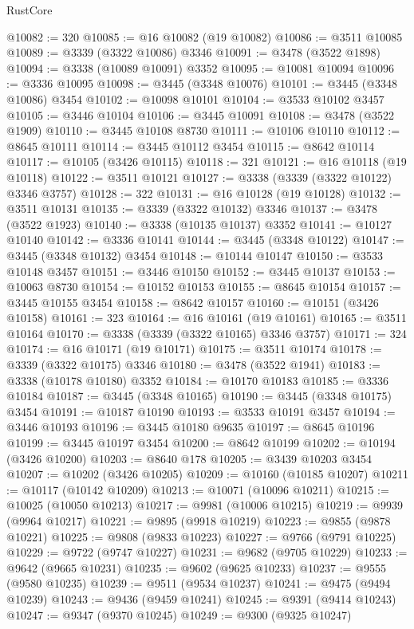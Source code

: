 \begin{lexlean}{RustCore}
\begin{coremodule}
@10082 := 320
@10085 := @16 @10082 (@19 @10082)
@10086 := @3511 @10085
@10089 := @3339 (@3322 @10086) @3346
@10091 := @3478 (@3522 @1898)
@10094 := @3338 (@10089 @10091) @3352
@10095 := @10081 @10094
@10096 := @3336 @10095
@10098 := @3445 (@3348 @10076)
@10101 := @3445 (@3348 @10086) @3454
@10102 := @10098 @10101
@10104 := @3533 @10102 @3457
@10105 := @3446 @10104
@10106 := @3445 @10091
@10108 := @3478 (@3522 @1909)
@10110 := @3445 @10108 @8730
@10111 := @10106 @10110
@10112 := @8645 @10111
@10114 := @3445 @10112 @3454
@10115 := @8642 @10114
@10117 := @10105 (@3426 @10115)
@10118 := 321
@10121 := @16 @10118 (@19 @10118)
@10122 := @3511 @10121
@10127 := @3338 (@3339 (@3322 @10122) @3346 @3757)
@10128 := 322
@10131 := @16 @10128 (@19 @10128)
@10132 := @3511 @10131
@10135 := @3339 (@3322 @10132) @3346
@10137 := @3478 (@3522 @1923)
@10140 := @3338 (@10135 @10137) @3352
@10141 := @10127 @10140
@10142 := @3336 @10141
@10144 := @3445 (@3348 @10122)
@10147 := @3445 (@3348 @10132) @3454
@10148 := @10144 @10147
@10150 := @3533 @10148 @3457
@10151 := @3446 @10150
@10152 := @3445 @10137
@10153 := @10063 @8730
@10154 := @10152 @10153
@10155 := @8645 @10154
@10157 := @3445 @10155 @3454
@10158 := @8642 @10157
@10160 := @10151 (@3426 @10158)
@10161 := 323
@10164 := @16 @10161 (@19 @10161)
@10165 := @3511 @10164
@10170 := @3338 (@3339 (@3322 @10165) @3346 @3757)
@10171 := 324
@10174 := @16 @10171 (@19 @10171)
@10175 := @3511 @10174
@10178 := @3339 (@3322 @10175) @3346
@10180 := @3478 (@3522 @1941)
@10183 := @3338 (@10178 @10180) @3352
@10184 := @10170 @10183
@10185 := @3336 @10184
@10187 := @3445 (@3348 @10165)
@10190 := @3445 (@3348 @10175) @3454
@10191 := @10187 @10190
@10193 := @3533 @10191 @3457
@10194 := @3446 @10193
@10196 := @3445 @10180 @9635
@10197 := @8645 @10196
@10199 := @3445 @10197 @3454
@10200 := @8642 @10199
@10202 := @10194 (@3426 @10200)
@10203 := @8640 @178
@10205 := @3439 @10203 @3454
@10207 := @10202 (@3426 @10205)
@10209 := @10160 (@10185 @10207)
@10211 := @10117 (@10142 @10209)
@10213 := @10071 (@10096 @10211)
@10215 := @10025 (@10050 @10213)
@10217 := @9981 (@10006 @10215)
@10219 := @9939 (@9964 @10217)
@10221 := @9895 (@9918 @10219)
@10223 := @9855 (@9878 @10221)
@10225 := @9808 (@9833 @10223)
@10227 := @9766 (@9791 @10225)
@10229 := @9722 (@9747 @10227)
@10231 := @9682 (@9705 @10229)
@10233 := @9642 (@9665 @10231)
@10235 := @9602 (@9625 @10233)
@10237 := @9555 (@9580 @10235)
@10239 := @9511 (@9534 @10237)
@10241 := @9475 (@9494 @10239)
@10243 := @9436 (@9459 @10241)
@10245 := @9391 (@9414 @10243)
@10247 := @9347 (@9370 @10245)
@10249 := @9300 (@9325 @10247)

\end{coremodule}
\end{lexlean}
